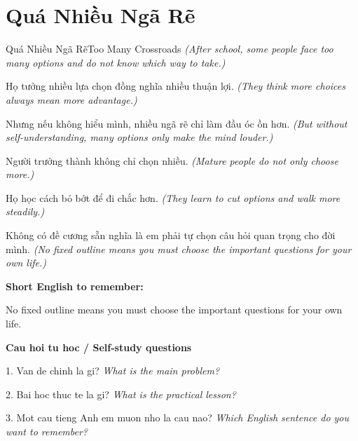 \section{Quá Nhiều Ngã Rẽ}
\begin{truyen}{Quá Nhiều Ngã Rẽ}{Too Many Crossroads}
\textit{(After school, some people face too many options and do not know which way to take.)}

Họ tưởng nhiều lựa chọn đồng nghĩa nhiều thuận lợi.
\textit{(They think more choices always mean more advantage.)}

Nhưng nếu không hiểu mình, nhiều ngã rẽ chỉ làm đầu óc ồn hơn.
\textit{(But without self-understanding, many options only make the mind louder.)}

Người trưởng thành không chỉ chọn nhiều.
\textit{(Mature people do not only choose more.)}

Họ học cách bỏ bớt để đi chắc hơn.
\textit{(They learn to cut options and walk more steadily.)}

\end{truyen}

\begin{baihoc}
Không có đề cương sẵn nghĩa là em phải tự chọn câu hỏi quan trọng cho đời mình.
\textit{(No fixed outline means you must choose the important questions for your own life.)}
\end{baihoc}

\begin{ghinhoanh}
\textbf{Short English to remember:}

No fixed outline means you must choose the important questions for your own life.

\end{ghinhoanh}

\begin{tuhocnhanh}
\textbf{Cau hoi tu hoc / Self-study questions}

1. Van de chinh la gi? \textit{What is the main problem?}

2. Bai hoc thuc te la gi? \textit{What is the practical lesson?}

3. Mot cau tieng Anh em muon nho la cau nao? \textit{Which English sentence do you want to remember?}
\end{tuhocnhanh}
\ngancach

